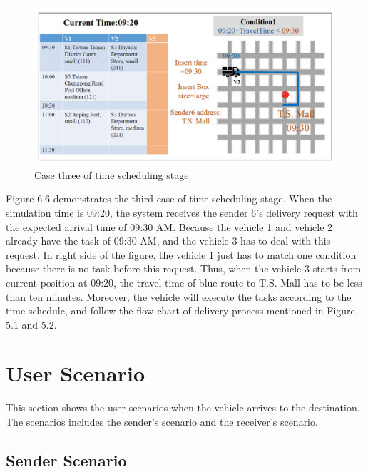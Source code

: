 \documentclass[12pt]{ksthesis}
\begin{document}
\begin{thesis}
{\begin{figure}[t]
\centering
\includegraphics[width=1.0\textwidth]{./Thesis_figures/F6-6_caseThree_SchedulingStage.PNG}
\caption{\large Case three of time scheduling stage.}
\vspace{0.5cm}
\label{Fig:CaseThree_TimeFiltering}
\end{figure}

Figure 6.6 demonstrates the third case of time scheduling stage. When the simulation time is 09:20, the system receives the sender 6’s delivery request with the expected arrival time of 09:30 AM. Because the vehicle 1 and vehicle 2 already have the task of 09:30 AM, and the vehicle 3 has to deal with this request. In right side of the figure, the vehicle 1 just has to match one condition because there is no task before this request. Thus, when the vehicle 3 starts from current position at 09:20, the travel time of blue route to T.S. Mall has to be less than ten minutes.
Moreover, the vehicle will execute the tasks according to the time schedule, and follow the flow chart of delivery process mentioned in Figure 5.1 and 5.2.


\section{User Scenario}

This section shows the user scenarios when the vehicle arrives to the destination. The scenarios includes the sender's scenario and the receiver's scenario.

\subsection{Sender Scenario}

}
\end{thesis}
\end{document}
